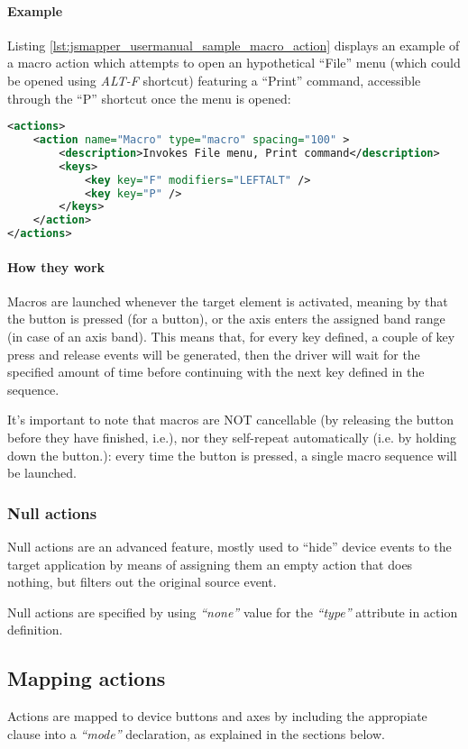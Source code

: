 \paragraph{Example}
Listing \ref{lst:jsmapper_usermanual_sample_macro_action} displays an example of a macro action which attempts to open an hypothetical ``File'' menu (which could be opened using \emph{ALT-F} shortcut) featuring a ``Print'' command, accessible through the ``P'' shortcut once the menu is opened: 
\begin{lstlisting}[language=XML,caption={Sample macro action},label={lst:jsmapper_usermanual_sample_macro_action}]
<actions>
	<action name="Macro" type="macro" spacing="100" >
		<description>Invokes File menu, Print command</description>
		<keys>
			<key key="F" modifiers="LEFTALT" />
			<key key="P" />
		</keys>
	</action>
</actions>
\end{lstlisting}


\paragraph{How they work}
Macros are launched whenever the target element is activated, meaning by that the button is pressed (for a button), or the axis enters the assigned band range (in case of an axis band). This means that, for every key defined, a couple of key press and release events will be generated, then the driver will wait for the specified amount of time before continuing with the next key defined in the sequence.

It's important to note that macros are NOT cancellable (by releasing the button before they have finished, i.e.), nor they self-repeat automatically (i.e. by holding down the button.): every time the button is pressed, a single macro sequence will be launched.


\subsubsection{Null actions}
Null actions are an advanced feature, mostly used to ``hide'' device events to the target application by means of assigning them an empty action that does nothing, but filters out the original source event.

Null actions are specified by using \emph{``none''} value for the \emph{``type''} attribute in action definition.

\subsection{Mapping actions}
Actions are mapped to device buttons and axes by including the appropiate clause into a \emph{``mode''} declaration, as explained in the sections below.

